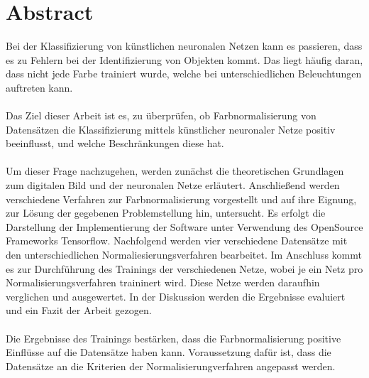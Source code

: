 \chapter*{Abstract}
Bei der Klassifizierung von künstlichen neuronalen Netzen kann es passieren, dass es zu Fehlern bei der Identifizierung von Objekten kommt. Das liegt häufig daran, dass nicht jede Farbe trainiert wurde, welche bei unterschiedlichen Beleuchtungen auftreten kann.\\\\
Das Ziel dieser Arbeit ist es, zu überprüfen, ob Farbnormalisierung von Datensätzen die Klassifizierung mittels künstlicher neuronaler Netze positiv beeinflusst, und welche Beschränkungen diese hat.\\\\
Um dieser Frage nachzugehen, werden zunächst die theoretischen Grundlagen zum digitalen Bild und der neuronalen Netze erläutert. Anschließend  werden  verschiedene Verfahren zur Farbnormalisierung vorgestellt und auf ihre Eignung, zur Lösung der gegebenen Problemstellung hin, untersucht. Es erfolgt die Darstellung der Implementierung der Software unter Verwendung des OpenSource Frameworks Tensorflow. Nachfolgend werden vier verschiedene Datensätze mit den unterschiedlichen Normaliesierungsverfahren bearbeitet. Im Anschluss kommt es zur Durchführung des Trainings der verschiedenen Netze, wobei je ein Netz pro Normalisierungsverfahren traininert wird. Diese Netze werden daraufhin verglichen und ausgewertet. In der Diskussion werden die Ergebnisse evaluiert und ein Fazit der Arbeit gezogen.\\\\
Die Ergebnisse des Trainings bestärken, dass die Farbnormalisierung positive Einflüsse auf die Datensätze haben kann. Voraussetzung dafür ist, dass die Datensätze an die Kriterien der Normalisierungverfahren angepasst werden. 

